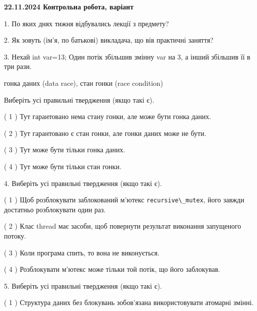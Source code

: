 \documentclass[12pt, ukrainian]{article}
\def\code#1{\Verb!#1!}
\begin{document}
\vspace{4mm}
\newpage
\begin {large}

\textbf{22.11.2024 Контрольна робота, варіант  }\par


{
1. По яких днях тижня відбувались лекції з предмету?



\vspace{5mm}
2. Як зовуть (ім'я, по батькові) викладача, що вів практичні заняття?



\vspace{5mm}
3. Нехай int var=13; Один потік збільшив змінну var на 3, а інший збільшив її в три рази.

гонка даних (data race), стан гонки (race condition)

Виберіть усі правильні твердження (якщо такі є).\par
\vspace{2mm}
( 1 ) Тут гарантовано нема стану гонки, але може бути гонка даних.%

( 2 ) Тут гарантовано є стан гонки, але гонки даних може не бути.%

( 3 ) Тут може бути тільки гонка даних.%

( 4 ) Тут може бути тільки стан гонки.%


\vspace{5mm}
4. Виберіть усі правильні твердження (якщо такі є).\par
\vspace{2mm}

( 1 ) Щоб розблокувати заблокований м’ютекс \code{recursive\_mutex}, його завжди достатньо розблокувати один раз.%

( 2 ) Клас thread має засоби, щоб повернути результат виконання запущеного потоку.%

( 3 ) Коли програма спить, то вона не виконується.%

( 4 ) Розблокувати м’ютекс може тільки той потік, що його заблокував.%


\vspace{5mm}
5. Виберіть усі правильні твердження (якщо такі є).\par
\vspace{2mm}

( 1 ) Структура даних без блокувань зобов’язана використовувати атомарні змінні.%

}
\end{large}
\end{document}
